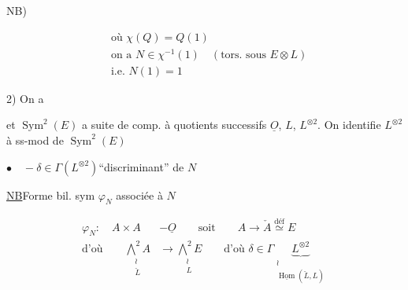 NB)


\[
\begin{aligned}
&\text{où }\chi(Q)=Q(1)\\
&\text{on a }N\in\chi^{-1}(1)\quad(\text{tors. sous }E\otimes L)\\
&\text{i.e. }N(1)=1
\end{aligned}
\]

 2)  On a


et $\operatorname{Sym}^2(E)$ a suite de comp. à quotients successifs $\underline O$, $L$, $L^{\otimes2}$. On identifie $L^{\otimes2}$ à ss-mod de $\operatorname{Sym}^2(E)$


$\bullet\quad-\delta\in\Gamma(L^{\otimes2})$\qquad ``discriminant'' de $N$

\uline{NB}\qquad Forme bil. sym $\varphi_N$ associée à $N$

\[
\begin{aligned}
\varphi_N:\quad A\times A&\mathbin{-}\underline O\qquad\text{soit}\qquad A\longrightarrow\check A\overset{\mathrm{déf}}{\simeq}E\\
\text{d'où}\qquad \underset{\substack{\wr\\\check L}}{\bigwedge^2 A}&\longrightarrow\underset{\substack{\wr\\L}}{\bigwedge^2 E}\qquad\text{d'où }\delta\in\Gamma\underbrace{L^{\otimes2}}_{\substack{\wr\\\underline{\operatorname{Hom}}(\check L,L)}}
\end{aligned}
\]


